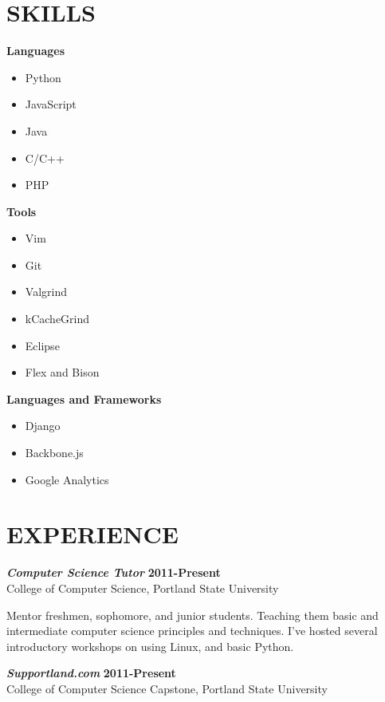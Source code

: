 \documentclass[margin]{res}
\begin{document}
\begin{resume}
\section{SKILLS}
    \begin{multicol}{3}
        \textbf{Languages}
        \begin{itemize}
            \item Python
            \item JavaScript
            \item Java
            \item C/C++
            \item PHP
        \end{itemize}
        \columnbreak

        \textbf{Tools}
        \begin{itemize}
            \item Vim
            \item Git
            \item Valgrind
            \item kCacheGrind
            \item Eclipse
            \item Flex and Bison
        \end{itemize}
        \columnbreak

        \textbf{Languages and Frameworks}
        \begin{itemize}
            \item Django
            \item Backbone.js
            \item Google Analytics
        \end{itemize}
    \end{multicol}

\section{EXPERIENCE}
    {\sl \textbf{Computer Science Tutor}} \hfill \textbf{2011-Present} \\
    College of Computer Science, Portland State University \hfill

    Mentor freshmen, sophomore, and junior students.  Teaching them basic and intermediate 
    computer science principles and techniques.	I've hosted several introductory workshops 
    on using Linux, and basic Python.

    {\sl \textbf{Supportland.com}} \hfill \textbf{2011-Present} \\
    College of Computer Science Capstone, Portland State University \hfill


\end{resume}
\end{document}
